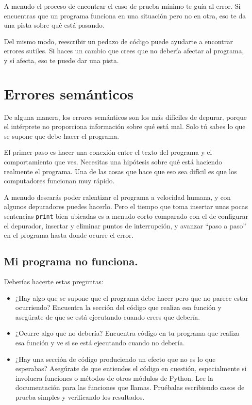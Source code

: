 \documentclass[10pt]{book}
\begin{document}
A menudo el proceso de encontrar el caso de prueba mínimo te guía al
error.  Si encuentras que un programa funciona en una situación pero no en
otra, eso te da una pista sobre qué está pasando.

Del mismo modo, reescribir un pedazo de código puede ayudarte a encontrar
errores sutiles.  Si haces un cambio que crees que no debería afectar al
programa, y sí afecta, eso te puede dar una pista.


\section{Errores semánticos}

De alguna manera, los errores semánticos son los más difíciles de depurar,
porque el intérprete no proporciona información
sobre qué está mal.  Solo tú sabes lo que se supone que debe hacer el
programa.

El primer paso es hacer una conexión entre el texto del programa
y el comportamiento que ves.  Necesitas una hipótesis
sobre qué está haciendo realmente el programa.  Una de las cosas
que hace que eso sea difícil es que los computadores funcionan muy rápido.

A menudo desearás poder ralentizar el programa a velocidad humana,
y con algunos depuradores puedes hacerlo.  Pero el tiempo que toma insertar
unas pocas sentencias {\tt print} bien ubicadas es a menudo corto comparado 
con el de configurar el depurador, insertar y eliminar puntos de interrupción,
y avanzar ``paso a paso'' en el programa hasta donde ocurre el error.


\subsection{Mi programa no funciona.}

Deberías hacerte estas preguntas:

\begin{itemize}

\item ¿Hay algo que se supone que el programa debe hacer pero
que no parece estar ocurriendo?  Encuentra la sección del código
que realiza esa función y asegúrate de que se está ejecutando cuando
crees que debería.

\item ¿Ocurre algo que no debería?  Encuentra código en
tu programa que realiza esa función y ve si se está
ejecutando cuando no debería.

\item ¿Hay una sección de código produciendo un efecto que no es
lo que esperabas?  Asegúrate de que entiendes el código en
cuestión, especialmente si involucra funciones o métodos de
otros módulos de Python.  Lee la documentación para las funciones que llamas.
Pruébalas escribiendo casos de prueba simples y verificando los resultados.

\end{itemize}
\end{document}
